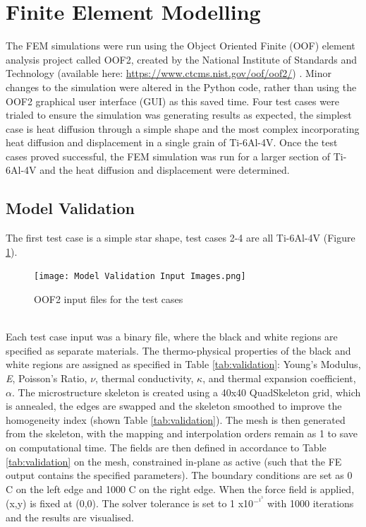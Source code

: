 \documentclass[report.tex]{subfiles}
\begin{document}
\section{Finite Element Modelling}
The FEM simulations were run using the Object Oriented Finite (OOF) element analysis project called OOF2, created by the National Institute of Standards and Technology (available here: \url{https://www.ctcms.nist.gov/oof/oof2/}) \cite{OOF2Modelling}. Minor changes to the simulation were altered in the Python code, rather than using the OOF2 graphical user interface (GUI) as this saved time. Four test cases were trialed to ensure the simulation was generating results as expected, the simplest case is heat diffusion through a simple shape and the most complex incorporating heat diffusion and displacement in a single grain of Ti-6Al-4V. Once the test cases proved successful, the FEM simulation was run for a larger section of Ti-6Al-4V and the heat diffusion and displacement were determined.

\subsection{Model Validation}
The first test case is a simple star shape, test cases 2-4 are all Ti-6Al-4V (Figure \ref{fig:OOF2Input}).
\\
\begin{figure}[h]
    \centering
    \texttt{[image: Model Validation Input Images.png]}
    \caption{OOF2 input files for the test cases}
    \label{fig:OOF2Input}
\end{figure}
\\
Each test case input was a binary file, where the black and white regions are specified as separate materials. The thermo-physical properties of the black and white regions are assigned as specified in Table \ref{tab:validation}: Young's Modulus, \textit{E}, Poisson's Ratio, $\nu$, thermal conductivity, $\kappa$, and thermal expansion coefficient, $\alpha$. The microstructure skeleton is created using a 40x40 QuadSkeleton grid, which is annealed, the edges are swapped and the skeleton smoothed to improve the homogeneity index (shown Table \ref{tab:validation}). The mesh is then generated from the skeleton, with the mapping and interpolation orders remain as 1 to save on computational time. The fields are then defined in accordance to Table \ref{tab:validation} on the mesh, constrained in-plane as active (such that the FE output contains the specified parameters). The boundary conditions are set as 0 \degree C on the left edge and 1000 \degree C on the right edge. When the force field is applied, (x,y) is fixed at (0,0). The solver tolerance is set to 1 x10$^-^1^3$ with 1000 iterations and the results are visualised.
\end{document}
